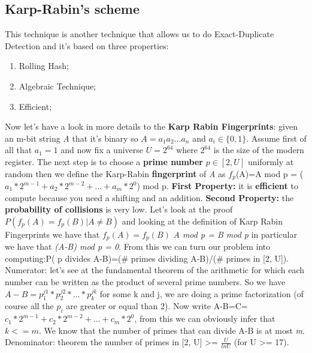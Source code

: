 \subsection{Karp-Rabin's scheme}
This technique is another technique that allows us to do Exact-Duplicate Detection and it's based on three properties:
\begin{enumerate}
    \item Rolling Hash;
    \item Algebraic Technique;
    \item Efficient;
\end{enumerate}
Now let's have a look in more details to the \textbf{Karp Rabin Fingerprints}: given an m-bit string \textit{A} that it's binary so $A=a_1a_2...a_n$ and $a_i \in \{0,1\}$.
Assume first of all that $a_1=1$ and now fix a universe $U=2^{64}$ where $2^{64}$ is the size of the modern register.\newline
The next step is to choose a \textbf{prime number} $p \in [2, U]$ uniformly at random then we define the Karp-Rabin \textbf{fingerprint} of \textit{A} as $f_p$(A)=A mod p = ($a_1*2^{m-1}+a_2*2^{m-2}+...+a_m*2^0$) mod p.\newline
\textbf{First Property:} it is \textbf{efficient} to compute because you need a shifting and an addition.\newline
\textbf{Second Property:} the \textbf{probability of collisions} is very low. Let's look at the proof $P(f_p(A)=f_p(B)| A \neq B)$ and looking at the definition of Karp Rabin Fingerprints we have that $f_p(A)=f_p(B)$ \textit{A mod p = B mod p} in particular we have that \textit{(A-B) mod p = 0}. From this we can turn our problem into computing:\newline P( p divides A-B)=(\# primes dividing A-B)/(\# primes in [2, U]).\newline
Numerator: let's see at the fundamental theorem of the arithmetic for which each number can be written as the product of several prime numbers. So we have $A-B=p_1^{j1}*p_2^{j2}*...*p_k^{jk}$ for some k and j, we are doing a prime factorization (of course all the $p_i$ are greater or equal than 2).\newline
Now write A-B=C=$c_1*2^{m-1}+c_2*2^{m-2}+...+c_m*2^0$, from this we can obviously infer that $k <= m$. We know that the number of primes that can divide A-B is at most \textit{m}.\newline
Denominator: theorem the number of primes in [2, U] >= $\frac{U}{ln U}$ (for U >= 17).\newline
